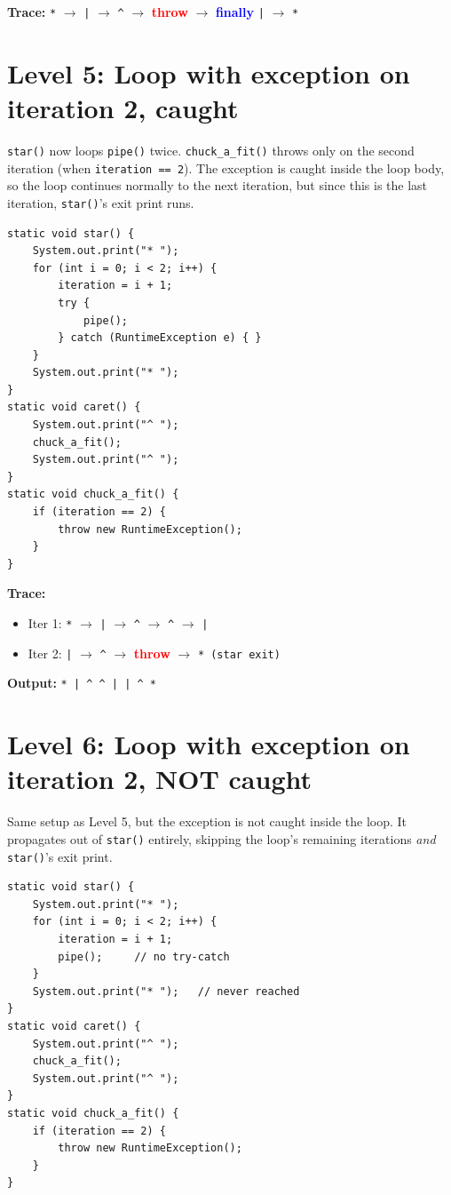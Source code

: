 \documentclass[twoside=false,DIV=14]{scrartcl}
\begin{document}
\textbf{Trace:} \texttt{*} $\rightarrow$ \texttt{|} $\rightarrow$ \texttt{\^{}} $\rightarrow$ \textbf{\textcolor{red}{throw}} $\rightarrow$ \textbf{\textcolor{blue}{finally}} \texttt{|} $\rightarrow$ \texttt{*}


\section*{Level 5: Loop with exception on iteration 2, caught}

\texttt{star()} now loops \texttt{pipe()} twice.  \texttt{chuck\_a\_fit()} throws only on the second iteration (when \texttt{iteration == 2}).  The exception is caught inside the loop body, so the loop continues normally to the next iteration, but since this is the last iteration, \texttt{star()}'s exit print runs.

\begin{lstlisting}
static void star() {
    System.out.print("* ");
    for (int i = 0; i < 2; i++) {
        iteration = i + 1;
        try {
            pipe();
        } catch (RuntimeException e) { }
    }
    System.out.print("* ");
}
static void caret() {
    System.out.print("^ ");
    chuck_a_fit();
    System.out.print("^ ");
}
static void chuck_a_fit() {
    if (iteration == 2) {
        throw new RuntimeException();
    }
}
\end{lstlisting}

\textbf{Trace:}
\begin{itemize}
\itemsep0em
\item Iter 1: \texttt{*} $\rightarrow$ \texttt{|} $\rightarrow$ \texttt{\^{}} $\rightarrow$ \texttt{\^{}} $\rightarrow$ \texttt{|}
\item Iter 2: \texttt{|} $\rightarrow$ \texttt{\^{}} $\rightarrow$ \textbf{\textcolor{red}{throw}} $\rightarrow$ \texttt{* (star exit)}
\end{itemize}

\textbf{Output:} \texttt{* | \^{} \^{} | | \^{} *}

\section*{Level 6: Loop with exception on iteration 2, NOT caught}

Same setup as Level 5, but the exception is not caught inside the loop.  It propagates out of \texttt{star()} entirely, skipping the loop's remaining iterations \emph{and} \texttt{star()}'s exit print.

\begin{lstlisting}
static void star() {
    System.out.print("* ");
    for (int i = 0; i < 2; i++) {
        iteration = i + 1;
        pipe();     // no try-catch
    }
    System.out.print("* ");   // never reached
}
static void caret() {
    System.out.print("^ ");
    chuck_a_fit();
    System.out.print("^ ");
}
static void chuck_a_fit() {
    if (iteration == 2) {
        throw new RuntimeException();
    }
}
\end{lstlisting}
\end{document}
